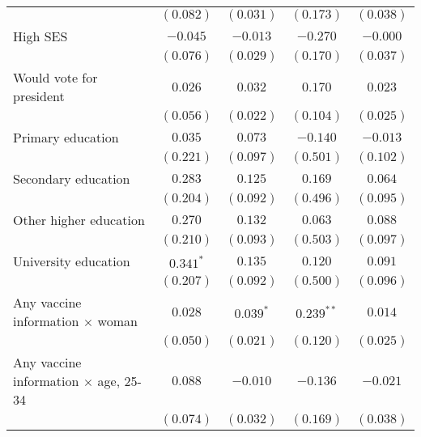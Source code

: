 \begin{table}
\begin{center}
\begin{tabular}{l c c c c}
                                                          & $(0.082)$   & $(0.031)$   & $(0.173)$     & $(0.038)$ \\
High SES                                                  & $-0.045$    & $-0.013$    & $-0.270$      & $-0.000$  \\
                                                          & $(0.076)$   & $(0.029)$   & $(0.170)$     & $(0.037)$ \\
Would vote for president                                  & $0.026$     & $0.032$     & $0.170$       & $0.023$   \\
                                                          & $(0.056)$   & $(0.022)$   & $(0.104)$     & $(0.025)$ \\
Primary education                                         & $0.035$     & $0.073$     & $-0.140$      & $-0.013$  \\
                                                          & $(0.221)$   & $(0.097)$   & $(0.501)$     & $(0.102)$ \\
Secondary education                                       & $0.283$     & $0.125$     & $0.169$       & $0.064$   \\
                                                          & $(0.204)$   & $(0.092)$   & $(0.496)$     & $(0.095)$ \\
Other higher education                                    & $0.270$     & $0.132$     & $0.063$       & $0.088$   \\
                                                          & $(0.210)$   & $(0.093)$   & $(0.503)$     & $(0.097)$ \\
University education                                      & $0.341^{*}$ & $0.135$     & $0.120$       & $0.091$   \\
                                                          & $(0.207)$   & $(0.092)$   & $(0.500)$     & $(0.096)$ \\
Any vaccine information $\times$ woman                    & $0.028$     & $0.039^{*}$ & $0.239^{**}$  & $0.014$   \\
                                                          & $(0.050)$   & $(0.021)$   & $(0.120)$     & $(0.025)$ \\
Any vaccine information $\times$ age, 25-34               & $0.088$     & $-0.010$    & $-0.136$      & $-0.021$  \\
                                                          & $(0.074)$   & $(0.032)$   & $(0.169)$     & $(0.038)$ \\

\end{tabular}
\end{center}
\end{table}
